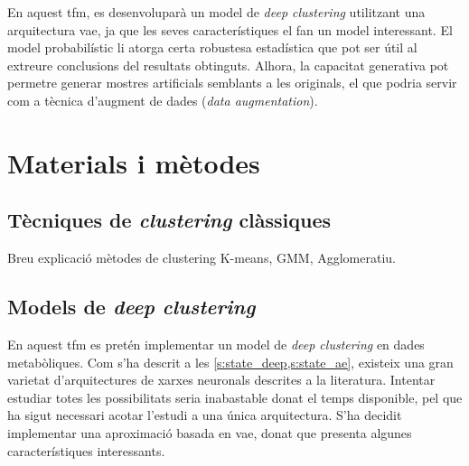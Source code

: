 \documentclass[CAT,BIB]{TFUOC}%
\newcommand{\todo}[1]{
            \begin{tcolorbox}[title=ToDo!, colback=red!5!white, colframe=red!50!black, coltext=red!50!black]
            #1
            \end{tcolorbox}}
\begin{document}
        En aquest \gls{tfm}, es desenvoluparà un model de \textit{deep clustering} utilitzant una arquitectura \gls{vae}, ja que les seves característiques el fan un model interessant. El model probabilístic li atorga certa robustesa estadística que pot ser útil al extreure conclusions del resultats obtinguts. Alhora, la capacitat generativa pot permetre generar mostres artificials semblants a les originals, el que podria servir com a tècnica d'augment de dades (\textit{data augmentation}).


\chapter{Materials i mètodes}
\label{c:metodes}

    \section{Tècniques de \textit{clustering} clàssiques}
    \label{s:metodes_classic}

\todo{Breu explicació mètodes de clustering K-means, GMM, Agglomeratiu.}


    \section{Models de \textit{deep clustering}}
    \label{s:metodes_dc}

    En aquest \gls{tfm}
    es pretén implementar un model de \textit{deep clustering} en dades metabòliques.
    Com s'ha descrit a les \cref{s:state_deep,s:state_ae},
    existeix una gran varietat d'arquitectures de xarxes neuronals descrites a la literatura.
    Intentar estudiar totes les possibilitats seria inabastable donat el temps disponible,
    pel que ha sigut necessari acotar l'estudi a una única arquitectura.
    S'ha decidit implementar una aproximació basada en \gls{vae},
    donat que presenta algunes característiques interessants.
\end{document}
